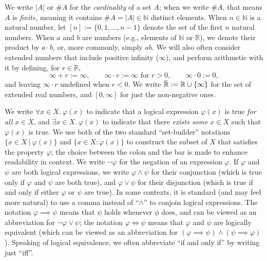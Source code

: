 We write $|A|$ or $\# A$ for the \emph{cardinality} of a set $A$;
    when we write $\#A$, that means $A$ is \emph{finite}, 
    meaning it contains $\#A = |A| \in \mathbb N$ distinct elements. 
When $n \in \mathbb N$ is a natural number, let
    $[n] := \{ 0, 1, \ldots, n-1 \}$ denote the set of the first $n$ natural numbers.
When $a$ and $b$ are numbers (e.g., elements of $\mathbb N$ or $\mathbb R$), we denote their product by $a \cdot b$, or, more commonly, simply $a b$.
We will also often consider extended numbers that include positive infinity ($\infty$), and perform arithmetic with it by defining, for $r \in \mathbb R$,
\[
    \infty + r := \infty,
    \qquad 
    \infty \cdot r := \infty \text{ for }r > 0,
    \qquad
    \infty \cdot 0 := 0,
\]
and leaving $\infty \cdot r$ undefined when $r < 0$. 
We write $\mskip1mu\overline{\mskip-1mu\mathbb R\!}\, := \mathbb R \cup \{\infty\}$ for the set of extended real numbers, and $[0, \infty]$ for just the non-negative ones. 


We write $\forall x \in X.~\varphi(x)$ to indicate that a logical expression $\varphi(x)$ is true \emph{for all} $x \in X$, and $\exists x \in X.~ \varphi(x)$ to indicate that there \emph{exists some} $x \in X$ such that $\varphi(x)$ is true.
We use both of the two standard ``set-builder'' notations 
$\{ x \in X ~|~ \varphi(x) \}$ 
    and
    $\{ x \in X : \varphi(x) \}$ 
    to construct the subset of $X$ that satisfies the property $\varphi$;
    the choice between the colon and the bar is made to enhance readability in context.
We write $\lnot\varphi$ for the negation of an expression $\varphi$. 
If $\varphi$ and $\psi$ are both logical expressions, we write $\varphi \land \psi$ for their conjunction (which is true only if $\varphi$ and $\psi$ are both true), and $\varphi \lor \psi$ for their disjunction (which is true if and only if either $\varphi$ or $\psi$ are true).
In some contexts, it is standard (and may feel more natural) to use a comma instead of ``$\land$'' to conjoin logical expressions. 
The notation $\varphi \implies \psi$ means that $\psi$ holds whenever $\phi$ does, and can be viewed as an abbreviation for $\lnot \varphi \lor \psi$; 
the notation $\varphi \iff \psi$ means that $\varphi$ and $\psi$ are logically equivalent (which can be viewed as an abbreviation for $(\varphi \implies \psi) \land (\psi \implies \varphi)$).
Speaking of logical equivalence, we often abbreviate ``if and only if'' by writing just ``iff''. 




